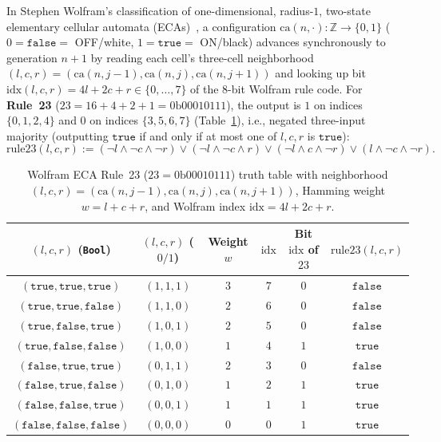 \documentclass[11pt]{article}
\theoremstyle{definition}
\newcommand{\Z}{\mathbb{Z}}
\newcommand{\ca}{\mathrm{ca}}
\newcommand{\ruleTwoThree}{\mathrm{rule23}}
\newcommand{\btrue}{\mathtt{true}}
\newcommand{\bfalse}{\mathtt{false}}
\begin{document}
In Stephen Wolfram's classification of one-dimensional, radius-$1$, two-state elementary cellular automata (ECAs)~\cite{wolfram2002}, a configuration $\ca(n, \cdot) : \Z \to \{0, 1\}$ ($0 = \bfalse =$ OFF/white, $1 = \btrue =$ ON/black) advances synchronously to generation $n + 1$ by reading each cell's three-cell neighborhood $(l, c, r) = (\ca(n, j - 1), \ca(n, j), \ca(n, j + 1))$ and looking up bit $\mathrm{idx}(l, c, r) = 4l + 2c + r \in \{0, \dots, 7\}$ of the $8$-bit Wolfram rule code. For \textbf{Rule~23} ($23 = 16 + 4 + 2 + 1 = 0\mathrm{b}00010111$), the output is $1$ on indices $\{0, 1, 2, 4\}$ and $0$ on indices $\{3, 5, 6, 7\}$ (Table~\ref{tab:rule23}), i.e., negated three-input majority (outputting $\btrue$ if and only if at most one of $l, c, r$ is $\btrue$):
\begin{equation}
\label{eq:rule23}
\ruleTwoThree(l, c, r) := (\neg l \land \neg c \land \neg r) \lor (\neg l \land \neg c \land r) \lor (\neg l \land c \land \neg r) \lor (l \land \neg c \land \neg r).
\end{equation}

\begin{table}[ht]
\centering
\caption{Wolfram ECA Rule~23 ($23 = 0\mathrm{b}00010111$) truth table with neighborhood $(l, c, r) = (\ca(n, j - 1), \ca(n, j), \ca(n, j + 1))$, Hamming weight $w = l + c + r$, and Wolfram index $\mathrm{idx} = 4l + 2c + r$.}
\label{tab:rule23}
\smallskip
{\small
\begin{tabular}{@{}cccccc@{}}
\toprule
$(l, c, r)$ (\texttt{Bool}) & $(l, c, r)$ ($0/1$) & Weight $w$ & $\mathrm{idx}$ & Bit $\mathrm{idx}$ of $23$ & $\ruleTwoThree(l, c, r)$ \\
\midrule
$(\btrue, \btrue, \btrue)$   & $(1, 1, 1)$ & $3$ & $7$ & $0$ & $\bfalse$ \\
$(\btrue, \btrue, \bfalse)$  & $(1, 1, 0)$ & $2$ & $6$ & $0$ & $\bfalse$ \\
$(\btrue, \bfalse, \btrue)$  & $(1, 0, 1)$ & $2$ & $5$ & $0$ & $\bfalse$ \\
$(\btrue, \bfalse, \bfalse)$ & $(1, 0, 0)$ & $1$ & $4$ & $1$ & $\btrue$  \\
$(\bfalse, \btrue, \btrue)$  & $(0, 1, 1)$ & $2$ & $3$ & $0$ & $\bfalse$ \\
$(\bfalse, \btrue, \bfalse)$ & $(0, 1, 0)$ & $1$ & $2$ & $1$ & $\btrue$  \\
$(\bfalse, \bfalse, \btrue)$ & $(0, 0, 1)$ & $1$ & $1$ & $1$ & $\btrue$  \\
$(\bfalse, \bfalse, \bfalse)$& $(0, 0, 0)$ & $0$ & $0$ & $1$ & $\btrue$  \\
\bottomrule
\end{tabular}
}
\end{table}
\end{document}
